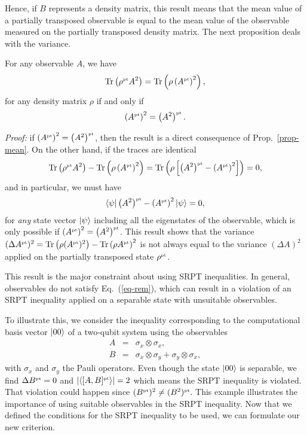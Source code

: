 Hence, if $B$ represents a density matrix, this result means that the mean value of a partially transposed observable is equal to the mean value of the observable measured on the partially transposed density matrix. The next proposition deals with the variance.

\begin{prop} \label{prop-rem}
  For any observable $A$, we have
  \[\mbox{\textup{Tr}}\left( \rho^{\mbox{\tiny \textup{pt}}} A^2 \right) = \mbox{\textup{Tr}}\left(  \rho \left(A^{\mbox{\tiny \textup{pt}}} \right)^2  \right), \]
  for any density matrix $\rho$ if and only if
  \[\left(A^{\mbox{\tiny \textup{pt}}}\right)^2 = \left(A^2\right)^{\mbox{\tiny \textup{pt}}} .\label{eq-rem}\]
\end{prop}

\emph{Proof: } if $ \left(A^{\mbox{\tiny \textup{pt}}}\right)^2 =\left(A^2\right)^{\mbox{\tiny \textup{pt}}}$, then the result is a direct consequence of Prop.~\ref{prop-mean}. On the other hand, if the traces are identical
\[ \mbox{\textup{Tr}}\left( \rho^{\mbox{\tiny \textup{pt}}} A^2 \right) - \mbox{\textup{Tr}}\left(  \rho \left(A^{\mbox{\tiny \textup{pt}}} \right)^2  \right) = \mbox{\textup{Tr}}\left(  \rho \left[ \left(A^2\right)^{\mbox{\tiny \textup{pt}}} - \left(A^{\mbox{\tiny \textup{pt}}} \right)^2 \right]  \right) = 0 ,\]
and in particular, we must have
\[ \langle \psi | \left(A^2\right)^{\mbox{\tiny \textup{pt}}} - \left(A^{\mbox{\tiny \textup{pt}}} \right)^2 | \psi \rangle =0,\]
for \emph{any} state vector $| \psi \rangle$ including all the eigenstates of the observable, which is only possible if $\left(A^{\mbox{\tiny \textup{pt}}}\right)^2 = \left(A^2\right)^{\mbox{\tiny \textup{pt}}}$. This result shows that the variance $(\Delta A^{\mbox{\tiny \textup{pt}}})^2=\mbox{\textup{Tr}}\left( \rho (A^{\mbox{\tiny \textup{pt}}})^2 \right)-\mbox{\textup{Tr}}\left( \rho A^{\mbox{\tiny \textup{pt}}} \right)^2$ is not always equal to the variance $(\Delta A)^2$ applied on the partially transposed state $\rho^{\mbox{\tiny \textup{pt}}}$.

This result is the major constraint about using SRPT inequalities. In general, observables do not  satisfy Eq.~(\ref{eq-rem}), which can result in a violation of an SRPT inequality applied on a separable state with unsuitable observables.

To illustrate this, we consider the inequality corresponding to the computational basis vector $| 00 \rangle$ of a two-qubit system using the observables
\begin{eqnarray}
  A &=& \sigma_x\otimes\sigma_x, \\
  B &=& \sigma_x \otimes \sigma_y +  \sigma_y \otimes \sigma_x,
\end{eqnarray}
with $\sigma_x$ and $\sigma_y$ the Pauli operators. Even though the state $| 00 \rangle$ is separable, we find $\Delta B^{\mbox{\tiny \textup{pt}}} =0$ and $|\langle [A,B]^{\mbox{\tiny \textup{pt}}} \rangle|=2$ which means the SRPT inequality is violated. That violation could happen since $(B^{\mbox{\tiny \textup{pt}}})^2 \neq (B^2)^{\mbox{\tiny \textup{pt}}}$. This example illustrates the importance of using suitable observables in the SRPT inequality. Now that we defined the conditions for the SRPT inequality to be used, we can formulate our new criterion.

